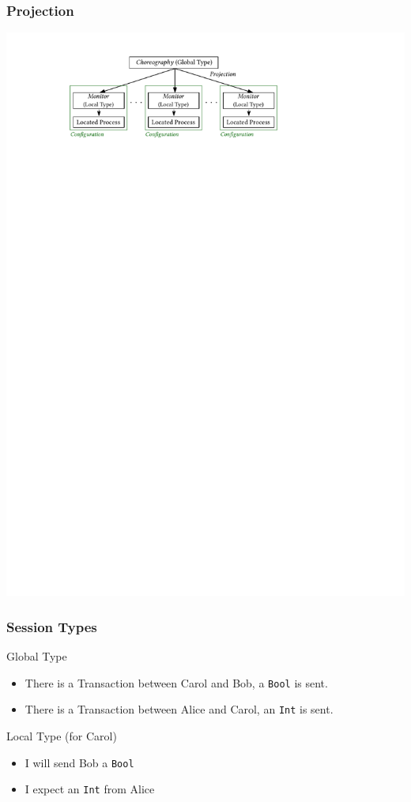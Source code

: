 \documentclass[12pt]{beamer}
\begin{document}
\begin{frame}
\frametitle{Projection}
\begin{center}
\includegraphics[scale=1.0]{figmodel.pdf}
\end{center}
\end{frame}
    

\begin{frame}[t]
\frametitle{Session Types}

Global Type

\begin{itemize}
    \item There is a Transaction between Carol and Bob, a \texttt{Bool} is sent.
    \item There is a Transaction between Alice and Carol, an \texttt{Int} is sent.
\end{itemize}

Local Type (for Carol)

\begin{itemize}
    \item I will send Bob a \texttt{Bool}
    \item I expect an \texttt{Int} from Alice
\end{itemize}

\end{frame}
\end{document}
